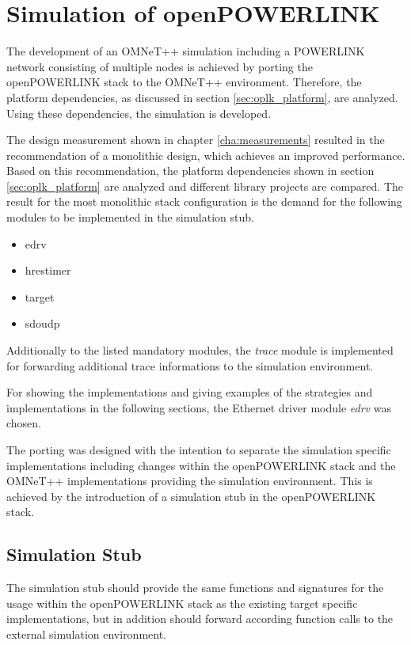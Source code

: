 \chapter{Simulation of openPOWERLINK}
\label{cha:porting}
\begin{sloppypar}
The development of an OMNeT++ simulation including a POWERLINK network consisting of multiple nodes is achieved by porting the openPOWERLINK stack to the OMNeT++ environment.
Therefore, the platform dependencies, as discussed in section \ref{sec:oplk_platform}, are analyzed.
Using these dependencies, the simulation is developed.
\end{sloppypar}

The design measurement shown in chapter \ref{cha:measurements} resulted in the recommendation of a monolithic design, which achieves an improved performance.
Based on this recommendation, the platform dependencies shown in section \ref{sec:oplk_platform} are analyzed and different library projects are compared.
The result for the most monolithic stack configuration is the demand for the following modules to be implemented in the simulation stub.

\begin{itemize}
    \item edrv
    \item hrestimer
    \item target
    \item sdoudp
\end{itemize}

Additionally to the listed mandatory modules, the \emph{trace} module is implemented for forwarding additional trace informations to the simulation environment.

For showing the implementations and giving examples of the strategies and implementations in the following sections, the Ethernet driver module \emph{edrv} was chosen.

The porting was designed with the intention to separate the simulation specific implementations including changes within the openPOWERLINK stack and the OMNeT++ implementations providing the simulation environment.
This is achieved by the introduction of a simulation stub in the openPOWERLINK stack.

\section{Simulation Stub}
\label{sec:porting_simstub}

The simulation stub should provide the same functions and signatures for the usage within the openPOWERLINK stack as the existing target specific implementations, but in addition should forward according function calls to the external simulation environment.


